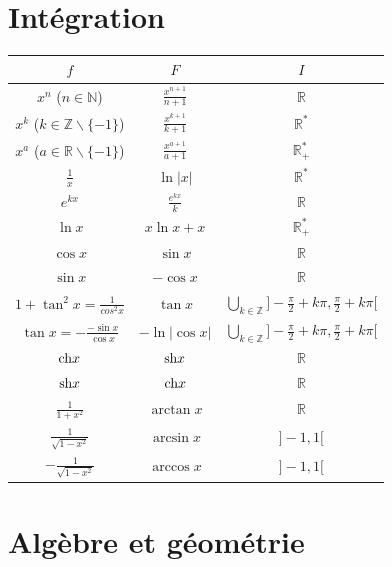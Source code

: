\documentclass[]{article}
\begin{document}
\section{Intégration}
\begin{center}
    \renewcommand{\arraystretch}{1.5}
    \begin{tabular}{|c|c|c|}
        \hline
        $f$ & $F$ & $I$ \\
        \hline
        $x^n$ ($n \in \mathbb{N}$) & $\frac{x^{n+1}}{n+1}$ & $\mathbb{R}$ \\
        \hline
        $x^k$ ($k \in \mathbb{Z}\backslash\{-1\}$) & $\frac{x^{k+1}}{k+1}$ & $\mathbb{R}^*$ \\
        \hline
        $x^a$ ($a \in \mathbb{R}\backslash\{-1\}$) & $\frac{x^{a+1}}{a+1}$ & $\mathbb{R}_+^*$ \\
        \hline
        $\frac{1}{x}$ & $\ln{|x|}$ & $\mathbb{R}^*$ \\
        \hline
        $e^{kx}$ & $\frac{e^{kx}}{k}$ & $\mathbb{R}$ \\
        \hline
        $\ln x$ & $x \ln x + x$ & $\mathbb{R}^*_+$ \\
        \hline
        $\cos{x}$ & $\sin{x}$ & $\mathbb{R}$ \\
        \hline
        $\sin{x}$ & $-\cos{x}$ & $\mathbb{R}$ \\
        \hline
        $1+\tan^2{x} = \frac{1}{cos^2{x}}$ & $\tan{x}$ & $\bigcup_{k\in\mathbb{Z}} ] -\frac{\pi}{2} + k\pi, \frac{\pi}{2} + k\pi [$ \\
        \hline
        $\tan{x} = - \frac{- \sin{x}}{\cos{x}}$ & $-\ln{|\cos{x}|}$ & $\bigcup_{k\in\mathbb{Z}} ] -\frac{\pi}{2} + k\pi, \frac{\pi}{2} + k\pi [$ \\
        \hline
        $\text{ch}{x}$ & $\text{sh}{x}$ & $\mathbb{R}$ \\
        \hline
        $\text{sh}{x}$ & $\text{ch}{x}$ & $\mathbb{R}$ \\
        \hline
        $\frac{1}{1+x^2}$ & $\arctan{x}$ & $\mathbb{R}$ \\
        \hline
        $\frac{1}{\sqrt{1-x^2}}$ & $\arcsin{x}$ & $]-1, 1 [$ \\
        \hline
        $-\frac{1}{\sqrt{1-x^2}}$ & $\arccos{x}$ & $]-1, 1 [$ \\
        \hline
    \end{tabular}
\end{center}

\section{Algèbre et géométrie}
\end{document}

